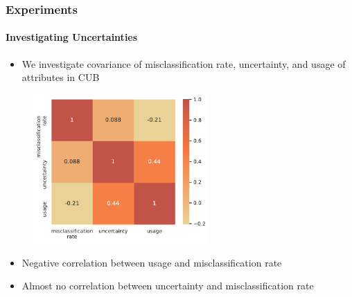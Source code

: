 \documentclass[9pt]{beamer}
\begin{document}
\begin{frame}	
\frametitle{Experiments}
\framesubtitle{Investigating Uncertainties}
\begin{itemize}
	\item We investigate covariance of misclassification rate, uncertainty, and usage of attributes in CUB
\end{itemize} %
	\begin{figure}
		\centering
		\includegraphics[width=0.6\textwidth]{images/corr_matrix.pdf}
	\end{figure}
	\begin{itemize}
		\item Negative correlation between usage and misclassification rate
		\item Almost no correlation between uncertainty and misclassification rate
	\end{itemize}
\end{frame}
\end{document}
